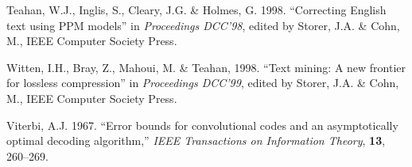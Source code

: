 \documentclass[11pt]{article}
\begin{document}
{\begin{list}{}{\setlength{\parsep}{0.1 cm} \setlength{\rightmargin}{0 cm}
\setlength{\leftmargin}{0 cm}}
\item []
Teahan, W.J., Inglis, S., Cleary, J.G. \& Holmes, G. 1998.
``Correcting English text using PPM models'' in
{\em Proceedings DCC'98}, edited by Storer, J.A. \& Cohn, M.,
IEEE Computer Society Press.

\item []
Witten, I.H., Bray, Z., Mahoui, M. \& Teahan, 1998.
``Text mining: A new frontier for lossless compression'' in
{\em Proceedings DCC'99}, edited by Storer, J.A. \& Cohn, M.,
IEEE Computer Society Press.

\item []
Viterbi, A.J. 1967. ``Error bounds for convolutional codes and an
asymptotically optimal decoding algorithm,'' {\em IEEE Transactions on
Information Theory}, {\bf 13}, 260--269.

\end{list}
}

\baselineskip 9pt
\end{document}
